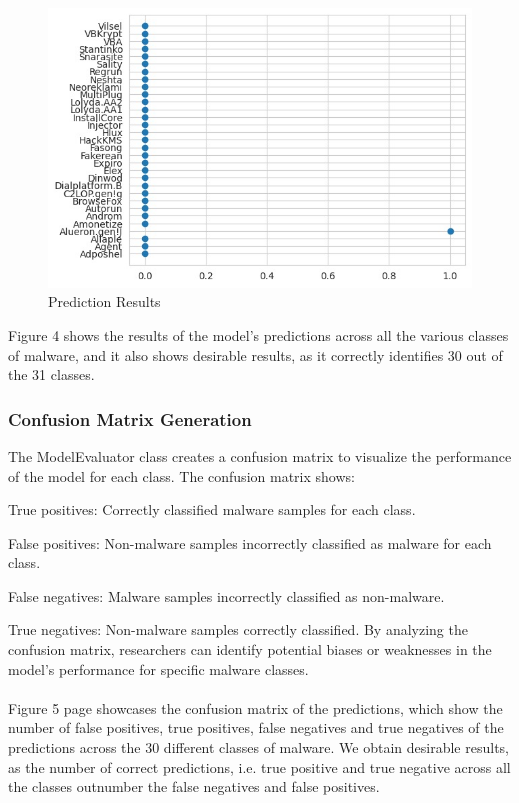 \documentclass[conference]{IEEEtran}
\begin{document}
    \begin{figure}[h] %
        \centering %
        \includegraphics[scale=0.4]{PredictionResults.jpeg} %
        \caption{Prediction Results } %
        \label{fig:example7} %
      \end{figure}


      Figure 4 shows the results of the model's predictions across all the various classes of malware, and it also shows desirable results, as it correctly identifies 30 out of the 31 classes.


\subsubsection{Confusion Matrix Generation}

    The ModelEvaluator class creates a confusion matrix to visualize the performance of the model for each class. The confusion matrix shows:
        
        True positives: Correctly classified malware samples for each class.
        
        False positives: Non-malware samples incorrectly classified as malware 
        for each class.

        False negatives: Malware samples incorrectly classified as non-malware.
        
        True negatives: Non-malware samples correctly classified.
    By analyzing the confusion matrix, researchers can identify potential biases or weaknesses in the model's performance for specific malware classes.
      \\
      \\
    Figure 5 page showcases the confusion matrix of the predictions, which show the number of false positives, true positives, false negatives and true negatives of the predictions across the 30 different classes of malware. We obtain desirable results, as the number of correct predictions, i.e. true positive and true negative across all the classes outnumber the false negatives and false positives.
\end{document}
